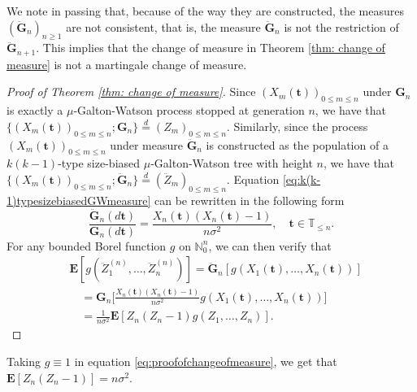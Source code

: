 \documentclass[12pt,a4paper]{amsart}
\numberwithin{equation}{section}
\begin{document}
	We note in passing that, because of the way they are constructed, the measures $(\ddot{\mathbf G}_n)_{n\ge 1}$ are not consistent, that is, the measure $\ddot{\mathbf G}_n$ is not the restriction of $\ddot{\mathbf G}_{n+1}$. 
	This implies that the change of measure in Theorem \ref{thm: change of measure} is not a martingale change of measure.
\medskip
\begin{proof}[Proof of Theorem \ref{thm: change of measure}]
	Since $(X_m( \mathbf t ))_{0\le m\le n}$ under ${\mathbf G}_n$ is exactly a $\mu$-Galton-Watson process stopped at generation $n$, we have that $\{(X_m( \mathbf t ))_{0\le m\le n}; {\mathbf G}_n\}  \overset{d}{=} (Z_m)_{0\le m\le n}.$
    Similarly, since the process $(X_m( \mathbf t ))_{0\le m\le n}$ under measure $\ddot{\mathbf G}_n$ is constructed as the population of a $k(k-1)$-type size-biased $\mu$-Galton-Watson tree with height $n$, we have that $\{(X_m( \mathbf t ))_{0\le m\le n};\ddot{\mathbf G}_n\}  \overset{d}{=} (\ddot Z_m)_{0\le m\le n}.$
	Equation \eqref{eq:k(k-1)typesizebiasedGWmeasure} can be rewritten in the following form
\begin{equation*}
    	\frac{\ddot{\mathbf G}_n(d \mathbf t )}{\mathbf G_n (d \mathbf t ) }
    =
    	\frac{X_n( \mathbf t )(X_n( \mathbf t )-1)}{n\sigma^2},
    \quad
    	 \mathbf t \in \mathbb T_{\leq n}.
\end{equation*}
    For any bounded Borel function $g$ on $\mathbb N_0^n$, we can then verify that
\begin{equation} \label{eq:proofofchangeofmeasure}
\begin{split}
	&\mathbf E [ g ( \ddot Z_1^{(n)}, \dots, \ddot Z_n^{(n)})]
	= \ddot{\mathbf G}_n [g ( X_1(  \mathbf t ), \dots, X_n(  \mathbf t ))]
    \\ &\quad = {\mathbf G}_n \big[ \frac { X_n( \mathbf t ) ( X_n( \mathbf t ) - 1)} {n \sigma^2} g (X_1( \mathbf t ), \dots, X_n( \mathbf t ))\big]
	\\&\quad = \frac { 1} { n \sigma^2} \mathbf E[ Z_n ( Z_n - 1) g( Z_1, \dots, Z_n)].
\end{split}
\end{equation}
\end{proof}
	Taking $g\equiv 1$ in equation \eqref{eq:proofofchangeofmeasure}, we get that $\mathbf E [Z_n(Z_n-1)]=n\sigma^2$.	
\end{document}
